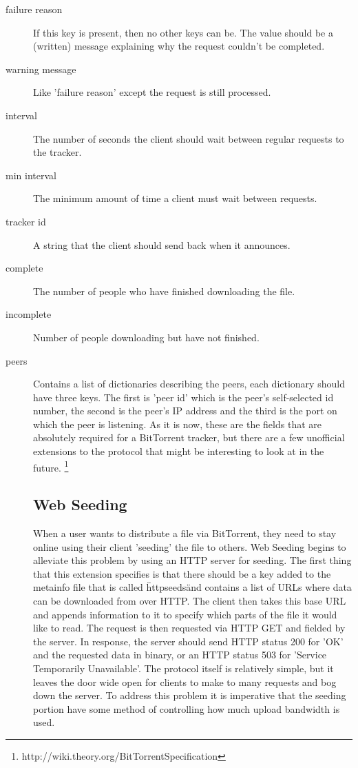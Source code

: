 \documentclass[a4paper,12pt]{report}
\begin{document}
\begin{description}
\item[failure reason] If this key is present, then no other keys can be. The value should be a (written) message explaining why the request couldn't be completed.
\item[warning message] Like 'failure reason' except the request is still processed.
\item[interval] The number of seconds the client should wait between regular requests to the tracker.
\item[min interval] The minimum amount of time a client must wait between requests.
\item[tracker id] A string that the client should send back when it announces.
\item[complete] The number of people who have finished downloading the file.
\item[incomplete] Number of people downloading but have not finished.
\item[peers] Contains a list of dictionaries describing the peers, each dictionary should have three keys. The first is 'peer id' which is the peer's self-selected id number, the second is the peer's IP address and the third is the port on which the peer is listening.
As it is now, these are the fields that are absolutely required for a BitTorrent tracker, but there are a few unofficial extensions to the protocol that might be interesting to look at in the future. \footnote{http://wiki.theory.org/BitTorrentSpecification}


\subsection{Web Seeding}
When a user wants to distribute a file via BitTorrent, they need to stay online using their client 'seeding' the file to others.
Web Seeding begins to alleviate this problem by using an HTTP server for seeding.
The first thing that this extension specifies is that there should be a key added to the metainfo file that is called \"httpseeds\" and contains a list of URLs where data can be downloaded from over HTTP.
The client then takes this base URL and appends information to it to specify which parts of the file it would like to read.
The request is then requested via HTTP GET and fielded by the server.
In response, the server should send HTTP status 200 for 'OK' and the requested data in binary, or an HTTP status 503 for 'Service Temporarily Unavailable'. 
The protocol itself is relatively simple, but it leaves the door wide open for clients to make to many requests and bog down the server.
To address this problem it is imperative that the seeding portion have some method of controlling how much upload bandwidth is used.



\end{description}
\end{document}
